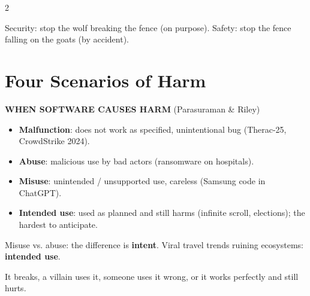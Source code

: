 \documentclass[a4paper,9pt]{extarticle}
\begin{document}
\begin{multicols}{2}
\begin{goat}

Security: stop the wolf breaking the fence (on purpose). Safety: stop the fence falling on the
goats (by accident).

\end{goat}



\section{Four Scenarios of Harm}


\begin{definition}

\textbf{WHEN SOFTWARE CAUSES HARM} (Parasuraman \& Riley)

\begin{itemize}

\item \textbf{Malfunction}: does not work as specified, unintentional bug (Therac-25,
CrowdStrike 2024).

\item \textbf{Abuse}: malicious use by bad actors (ransomware on hospitals).

\item \textbf{Misuse}: unintended / unsupported use, careless (Samsung code in ChatGPT).

\item \textbf{Intended use}: used as planned and still harms (infinite scroll, elections);
the hardest to anticipate.

\end{itemize}

\end{definition}


\begin{warning}

Misuse vs. abuse: the difference is \textbf{intent}. Viral travel trends ruining ecosystems:
\textbf{intended use}.

\end{warning}


\begin{goat}

It breaks, a villain uses it, someone uses it wrong, or it works perfectly and still hurts.

\end{goat}




\end{multicols}
\end{document}
